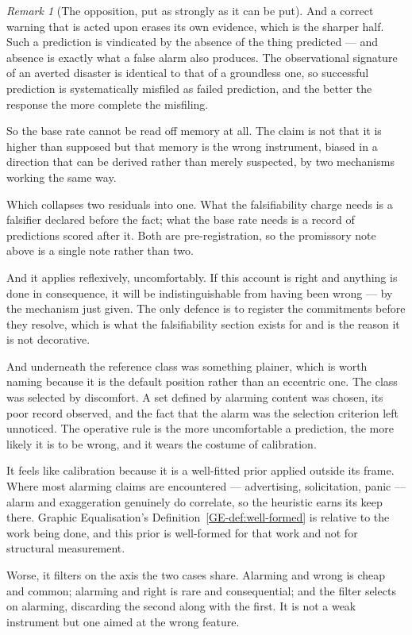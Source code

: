 \documentclass[11pt,a4paper]{article}
\theoremstyle{remark}
\newtheorem{remark}[definition]{Remark}
\begin{document}
\begin{remark}[The opposition, put as strongly as it can be put]
And a correct warning that is acted upon erases its own evidence, which is the sharper half. Such
a prediction is vindicated by the absence of the thing predicted --- and absence is exactly what a false
alarm also produces. The observational signature of an averted disaster is identical to that of a
groundless one, so successful prediction is systematically misfiled as failed prediction, and the
better the response the more complete the misfiling.

So the base rate cannot be read off memory at all. The claim is not that it is higher than
supposed but that memory is the wrong instrument, biased in a direction that can be derived rather
than merely suspected, by two mechanisms working the same way.

Which collapses two residuals into one. What the falsifiability charge needs is a falsifier
declared before the fact; what the base rate needs is a record of predictions scored after it. Both
are pre-registration, so the promissory note above is a single note rather than two.

And it applies reflexively, uncomfortably. If this account is right and anything is done in
consequence, it will be indistinguishable from having been wrong --- by the mechanism just given.
The only defence is to register the commitments before they resolve, which is what the falsifiability
section exists for and is the reason it is not decorative.

And underneath the reference class was something plainer, which is worth naming because it is the
default position rather than an eccentric one. The class was selected by discomfort. A set
defined by alarming content was chosen, its poor record observed, and the fact that the alarm was the
selection criterion left unnoticed. The operative rule is the more uncomfortable a prediction, the
more likely it is to be wrong, and it wears the costume of calibration.

It feels like calibration because it is a well-fitted prior applied outside its frame. Where most
alarming claims are encountered --- advertising, solicitation, panic --- alarm and exaggeration genuinely
do correlate, so the heuristic earns its keep there. Graphic Equalisation's Definition~\ref{GE-def:well-formed} is relative to the work
being done, and this prior is well-formed for that work and not for structural measurement.

Worse, it filters on the axis the two cases share. Alarming and wrong is cheap and common;
alarming and right is rare and consequential; and the filter selects on alarming, discarding the
second along with the first. It is not a weak instrument but one aimed at the wrong feature.


\end{remark}
\end{document}
